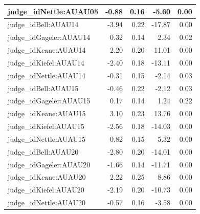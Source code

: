\documentclass{monashthesis}
\begin{document}
\begin{tabular}{l|r|r|r|r}
\hline
judge\_idNettle:AUAU05 & -0.88 & 0.16 & -5.60 & 0.00\\
\hline
judge\_idBell:AUAU14 & -3.94 & 0.22 & -17.87 & 0.00\\
\hline
judge\_idGageler:AUAU14 & 0.32 & 0.14 & 2.34 & 0.02\\
\hline
judge\_idKeane:AUAU14 & 2.20 & 0.20 & 11.01 & 0.00\\
\hline
judge\_idKiefel:AUAU14 & -2.40 & 0.18 & -13.11 & 0.00\\
\hline
judge\_idNettle:AUAU14 & -0.31 & 0.15 & -2.14 & 0.03\\
\hline
judge\_idBell:AUAU15 & -0.46 & 0.22 & -2.12 & 0.03\\
\hline
judge\_idGageler:AUAU15 & 0.17 & 0.14 & 1.24 & 0.22\\
\hline
judge\_idKeane:AUAU15 & 3.10 & 0.23 & 13.76 & 0.00\\
\hline
judge\_idKiefel:AUAU15 & -2.56 & 0.18 & -14.03 & 0.00\\
\hline
judge\_idNettle:AUAU15 & 0.82 & 0.15 & 5.32 & 0.00\\
\hline
judge\_idBell:AUAU20 & -2.80 & 0.20 & -14.01 & 0.00\\
\hline
judge\_idGageler:AUAU20 & -1.66 & 0.14 & -11.71 & 0.00\\
\hline
judge\_idKeane:AUAU20 & 2.22 & 0.25 & 8.86 & 0.00\\
\hline
judge\_idKiefel:AUAU20 & -2.19 & 0.20 & -10.73 & 0.00\\
\hline
judge\_idNettle:AUAU20 & -0.57 & 0.16 & -3.58 & 0.00\\
\hline
\end{tabular}
\end{document}
